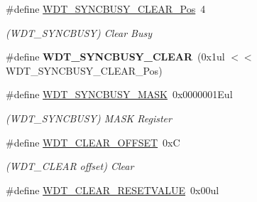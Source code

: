 \begin{DoxyCompactItemize}
\item 
\hypertarget{group___s_a_m_l21___w_d_t_gab72171e5b655f45b9033b9dbff8f8901}{}\#define \hyperlink{group___s_a_m_l21___w_d_t_gab72171e5b655f45b9033b9dbff8f8901}{W\+D\+T\+\_\+\+S\+Y\+N\+C\+B\+U\+S\+Y\+\_\+\+C\+L\+E\+A\+R\+\_\+\+Pos}~4\label{group___s_a_m_l21___w_d_t_gab72171e5b655f45b9033b9dbff8f8901}

\begin{DoxyCompactList}\small\item\em (W\+D\+T\+\_\+\+S\+Y\+N\+C\+B\+U\+S\+Y) Clear Busy \end{DoxyCompactList}\item 
\hypertarget{group___s_a_m_l21___w_d_t_gaf6fee24db8f1766fa836b43d7eda9e95}{}\#define {\bfseries W\+D\+T\+\_\+\+S\+Y\+N\+C\+B\+U\+S\+Y\+\_\+\+C\+L\+E\+A\+R}~(0x1ul $<$$<$ W\+D\+T\+\_\+\+S\+Y\+N\+C\+B\+U\+S\+Y\+\_\+\+C\+L\+E\+A\+R\+\_\+\+Pos)\label{group___s_a_m_l21___w_d_t_gaf6fee24db8f1766fa836b43d7eda9e95}

\item 
\hypertarget{group___s_a_m_l21___w_d_t_gaaa251df37c6a6d581f6ccba3728ca873}{}\#define \hyperlink{group___s_a_m_l21___w_d_t_gaaa251df37c6a6d581f6ccba3728ca873}{W\+D\+T\+\_\+\+S\+Y\+N\+C\+B\+U\+S\+Y\+\_\+\+M\+A\+S\+K}~0x0000001\+Eul\label{group___s_a_m_l21___w_d_t_gaaa251df37c6a6d581f6ccba3728ca873}

\begin{DoxyCompactList}\small\item\em (W\+D\+T\+\_\+\+S\+Y\+N\+C\+B\+U\+S\+Y) M\+A\+S\+K Register \end{DoxyCompactList}\item 
\hypertarget{group___s_a_m_l21___w_d_t_gaf1f57bd7a1a8ce2ae94864a7cea2e6e4}{}\#define \hyperlink{group___s_a_m_l21___w_d_t_gaf1f57bd7a1a8ce2ae94864a7cea2e6e4}{W\+D\+T\+\_\+\+C\+L\+E\+A\+R\+\_\+\+O\+F\+F\+S\+E\+T}~0x\+C\label{group___s_a_m_l21___w_d_t_gaf1f57bd7a1a8ce2ae94864a7cea2e6e4}

\begin{DoxyCompactList}\small\item\em (W\+D\+T\+\_\+\+C\+L\+E\+A\+R offset) Clear \end{DoxyCompactList}\item 
\hypertarget{group___s_a_m_l21___w_d_t_ga9192db22a2c21f7afda2b8117a96d6ef}{}\#define \hyperlink{group___s_a_m_l21___w_d_t_ga9192db22a2c21f7afda2b8117a96d6ef}{W\+D\+T\+\_\+\+C\+L\+E\+A\+R\+\_\+\+R\+E\+S\+E\+T\+V\+A\+L\+U\+E}~0x00ul\label{group___s_a_m_l21___w_d_t_ga9192db22a2c21f7afda2b8117a96d6ef}


\end{DoxyCompactItemize}
